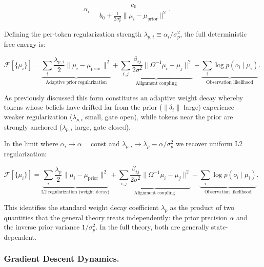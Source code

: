 \documentclass[twoside,11pt]{article}
\begin{document}
\begin{equation}
\alpha_i = \frac{c_0}{\displaystyle b_0 + \frac{1}{2\sigma_p^2}\|\mu_i - \mu_{\text{prior}}\|^2}.
\label{eq:alpha_i_deterministic}
\end{equation}

Defining the per-token regularization strength $\lambda_{p,i} \equiv \alpha_i / \sigma_p^2$, the full deterministic free energy is:

\begin{equation}
\mathcal{F}[\{\mu_i\}] = \underbrace{\sum_i \frac{\lambda_{p,i}}{2}\|\mu_i - \mu_{\text{prior}}\|^2}_{\text{Adaptive prior regularization}} + \underbrace{\sum_{i,j} \frac{\beta_{ij}}{2\sigma^2}\|\Omega^{-1}\mu_i - \mu_j\|^2}_{\text{Alignment coupling}} - \underbrace{\sum_i \log p(o_i \mid \mu_i)}_{\text{Observation likelihood}}.
\label{eq:deterministic_free_energy_adaptive}
\end{equation}

As previously discussed this form constitutes an adaptive weight decay whereby tokens whose beliefs have drifted far from the prior ($\|\delta_i\|$ large) experience weaker regularization ($\lambda_{p,i}$ small, gate open), while tokens near the prior are strongly anchored ($\lambda_{p,i}$ large, gate closed).

In the limit where $\alpha_i \to \alpha = \text{const}$ and $\lambda_{p,i} \to \lambda_p \equiv \alpha / \sigma_p^2$ we recover uniform L2 regularization:

\begin{equation}
\mathcal{F}[\{\mu_i\}] = \underbrace{\sum_i \frac{\lambda_p}{2}\|\mu_i - \mu_{\text{prior}}\|^2}_{\text{L2 regularization (weight decay)}} + \underbrace{\sum_{i,j} \frac{\beta_{ij}}{2\sigma^2}\|\Omega^{-1}\mu_i - \mu_j\|^2}_{\text{Alignment coupling}} - \underbrace{\sum_i \log p(o_i \mid \mu_i)}_{\text{Observation likelihood}}.
\label{eq:deterministic_free_energy_standard}
\end{equation}

This identifies the standard weight decay coefficient $\lambda_p$ as the product of two quantities that the general theory treats independently: the prior precision $\alpha$ and the inverse prior variance $1/\sigma_p^2$. In the full theory, both are generally state-dependent.

\subsubsection{Gradient Descent Dynamics.}
\end{document}
